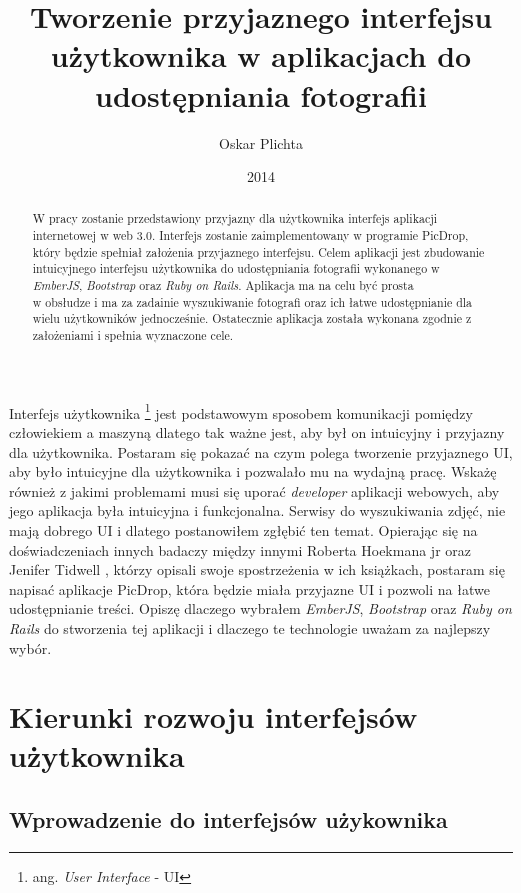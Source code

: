 \documentclass[brudnopis]{xmgr}
\author   {Oskar Plichta}
\title    {Tworzenie przyjaznego interfejsu użytkownika w aplikacjach do udostępniania fotografii }
\date     {2014}
\begin{document}
\begin{abstract}

W pracy zostanie przedstawiony przyjazny dla użytkownika interfejs aplikacji internetowej w web 3.0. Interfejs zostanie zaimplementowany w programie PicDrop,  który będzie spełniał założenia przyjaznego interfejsu. Celem aplikacji jest zbudowanie intuicyjnego interfejsu użytkownika do udostępniania fotografii wykonanego w \textit{EmberJS}, \textit{Bootstrap} oraz \textit{Ruby on Rails}. Aplikacja ma na celu być prosta \\ w obsłudze i ma za zadainie wyszukiwanie fotografi oraz ich łatwe udostępnianie dla wielu użytkowników jednocześnie. Ostatecznie aplikacja została wykonana zgodnie z założeniami i spełnia wyznaczone cele.

\end{abstract}

\maketitle
%
\introduction
Interfejs użytkownika \footnote{ang. \textit{User Interface} - UI}  jest podstawowym sposobem komunikacji pomiędzy człowiekiem a maszyną dlatego tak ważne jest, aby był on intuicyjny i przyjazny dla użytkownika. 
Postaram się pokazać na czym polega tworzenie przyjaznego UI, aby było intuicyjne dla użytkownika i pozwalało mu na wydajną pracę. Wskażę również z jakimi problemami musi się uporać \textit{developer} aplikacji webowych, aby jego aplikacja była intuicyjna i funkcjonalna. Serwisy do wyszukiwania zdjęć, nie mają dobrego UI i dlatego postanowiłem zgłębić ten temat. Opierając się na  doświadczeniach innych badaczy  między innymi Roberta Hoekmana jr  \cite {magiaUI} oraz Jenifer Tidwell  \cite {projektowanieUI}, którzy opisali swoje spostrzeżenia w ich książkach, postaram się napisać aplikacje PicDrop, która  będzie miała przyjazne UI i pozwoli na łatwe udostępnianie treści. Opiszę dlaczego wybrałem \textit{EmberJS}, \textit{Bootstrap} oraz \textit{Ruby on Rails} do stworzenia tej aplikacji i dlaczego te technologie uważam za najlepszy wybór.


\chapter{Kierunki rozwoju interfejsów użytkownika}

\section{Wprowadzenie do interfejsów użykownika}
\end{document}
